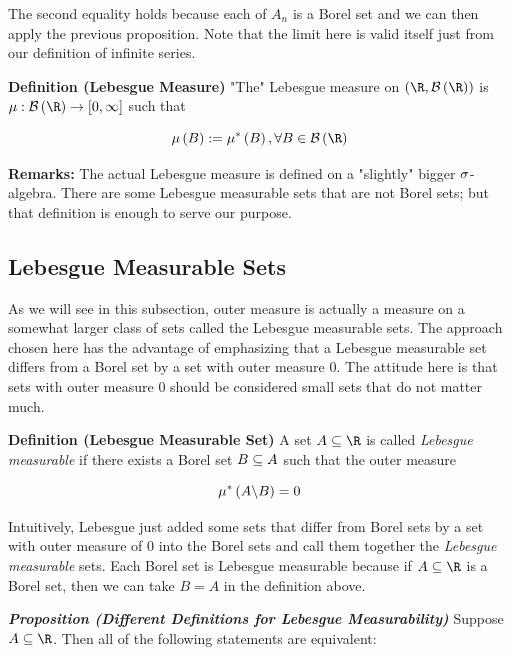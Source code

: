 \documentclass[
]{article}
\begin{document}
The second equality holds because each of \(A_n\) is a Borel set and we
can then apply the previous proposition. Note that the limit here is
valid itself just from our definition of infinite series.

\textbf{Definition (Lebesgue Measure)} "The" Lebesgue measure on
\(\pr{\R,\B\pr{\R}}\) is \(\mu:\B\pr{\R}\to \br{0,\infty}\) such that

\[\mu\pr{B}:=\mu^*\pr{B},\forall B\in \B\pr{\R}\]

\textbf{Remarks:} The actual Lebesgue measure is defined on a "slightly"
bigger \(\sigma\)-algebra. There are some Lebesgue measurable sets that are
not Borel sets; but that definition is enough to serve our purpose.

\hypertarget{lebesgue-measurable-sets}{%
\subsection{Lebesgue Measurable Sets}\label{lebesgue-measurable-sets}}

As we will see in this subsection, outer measure is actually a measure
on a somewhat larger class of sets called the Lebesgue measurable sets.
The approach chosen here has the advantage of emphasizing that a
Lebesgue measurable set differs from a Borel set by a set with outer
measure \(0\). The attitude here is that sets with outer measure \(0\)
should be considered small sets that do not matter much.

\textbf{Definition (Lebesgue Measurable Set)} A set \(A\se \R\) is
called \emph{Lebesgue measurable} if there exists a Borel set \(B\subseteq A\)
such that the outer measure

\[\mu^*\left(A\backslash B\right) = 0\]

Intuitively, Lebesgue just added some sets that differ from Borel sets
by a set with outer measure of \(0\) into the Borel sets and call them
together the \emph{Lebesgue measurable} sets. Each Borel set is Lebesgue
measurable because if \(A\se \R\) is a Borel set, then we can take
\(B = A\) in the definition above.

\emph{\textbf{Proposition (Different Definitions for Lebesgue
Measurability)}} Suppose \(A\se \R\). Then all of the following
statements are equivalent:
\end{document}
